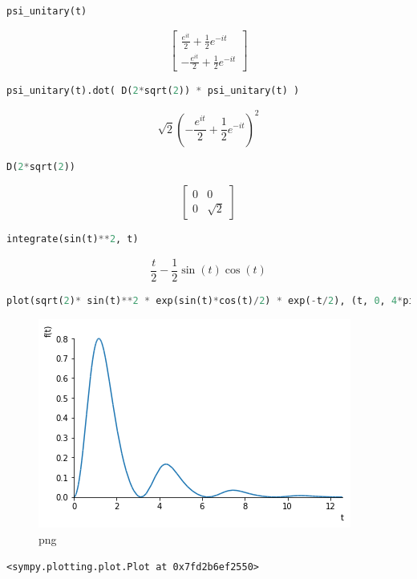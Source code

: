 \begin{lstlisting}[language=Python]
psi_unitary(t)
\end{lstlisting}

\[\left[\begin{matrix}\frac{e^{i t}}{2} + \frac{1}{2} e^{- i t}\\- \frac{e^{i t}}{2} + \frac{1}{2} e^{- i t}\end{matrix}\right]\]

\begin{lstlisting}[language=Python]
psi_unitary(t).dot( D(2*sqrt(2)) * psi_unitary(t) )
\end{lstlisting}

\[\sqrt{2} \left(- \frac{e^{i t}}{2} + \frac{1}{2} e^{- i t}\right)^{2}\]

\begin{lstlisting}[language=Python]
D(2*sqrt(2))
\end{lstlisting}

\[\left[\begin{matrix}0 & 0\\0 & \sqrt{2}\end{matrix}\right]\]

\begin{lstlisting}[language=Python]
integrate(sin(t)**2, t)
\end{lstlisting}

\[\frac{t}{2} - \frac{1}{2} \sin{\left (t \right )} \cos{\left (t \right )}\]

\begin{lstlisting}[language=Python]
plot(sqrt(2)* sin(t)**2 * exp(sin(t)*cos(t)/2) * exp(-t/2), (t, 0, 4*pi))
\end{lstlisting}

\begin{figure}
\centering
\includegraphics{img/2ldetect/prob_pw_expvD.png}
\caption{png}
\end{figure}

\begin{lstlisting}
<sympy.plotting.plot.Plot at 0x7fd2b6ef2550>
\end{lstlisting}


